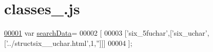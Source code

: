\hypertarget{classes__6_8js_source}{}\section{classes\+\_.\+js}
\label{classes__6_8js_source}

\begin{DoxyCode}
\hypertarget{classes__6_8js_source.tex_l00001}{}\hyperlink{classes__6_8js_ad01a7523f103d6242ef9b0451861231e}{00001} var \hyperlink{classes__6_8js_ad01a7523f103d6242ef9b0451861231e}{searchData}=
00002 [
00003   [\textcolor{stringliteral}{'six\_5fuchar'},[\textcolor{stringliteral}{'six\_uchar'},[\textcolor{stringliteral}{'../structsix\_\_uchar.html'},1,\textcolor{stringliteral}{''}]]]
00004 ];
\end{DoxyCode}
